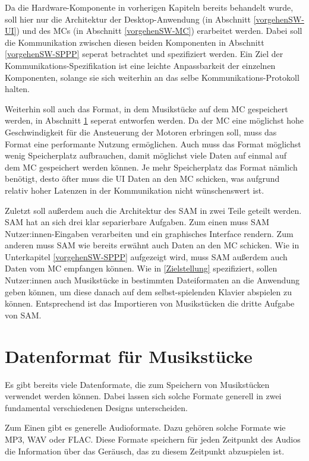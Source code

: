 Da die Hardware-Komponente in vorherigen Kapiteln bereits behandelt wurde, soll hier nur die Architektur der Desktop-Anwendung (in Abschnitt \ref{vorgehenSW-UI}) und des \ac{MC}s (in Abschnitt \ref{vorgehenSW-MC}) erarbeitet werden.
Dabei soll die Kommunikation zwischen diesen beiden Komponenten in Abschnitt \ref{vorgehenSW-SPPP} seperat betrachtet und spezifiziert werden.
Ein Ziel der Kommunikations-Spezifikation ist eine leichte Anpassbarkeit der einzelnen Komponenten, solange sie sich weiterhin an das selbe Kommunikations-Protokoll halten.

Weiterhin soll auch das Format, in dem Musikstücke auf dem \ac{MC} gespeichert werden, in Abschnitt \ref{vorgehenSW-PIDI} seperat entworfen werden.
Da der \ac{MC} eine möglichst hohe Geschwindigkeit für die Ansteuerung der Motoren erbringen soll, muss das Format eine performante Nutzung ermöglichen.
Auch muss das Format möglichst wenig Speicherplatz aufbrauchen, damit möglichst viele Daten auf einmal auf dem \ac{MC} gespeichert werden können.
Je mehr Speicherplatz das Format nämlich benötigt, desto öfter muss die \ac{UI} Daten an den \ac{MC} schicken, was aufgrund relativ hoher Latenzen in der Kommunikation nicht wünschenswert ist.

Zuletzt soll außerdem auch die Architektur des \ac{SAM} in zwei Teile geteilt werden.
\ac{SAM} hat an sich drei klar separierbare Aufgaben.
Zum einen muss \ac{SAM} Nutzer:innen-Eingaben verarbeiten und ein graphisches Interface rendern.
Zum anderen muss \ac{SAM} wie bereits erwähnt auch Daten an den \ac{MC} schicken.
Wie in Unterkapitel \ref{vorgehenSW-SPPP} aufgezeigt wird, muss \ac{SAM} außerdem auch Daten vom \ac{MC} empfangen können.
Wie in \ref{Zielstellung} spezifiziert, sollen Nutzer:innen auch Musikstücke in bestimmten Dateiformaten an die Anwendung geben können, um diese danach auf dem selbst-spielenden Klavier abspielen zu können.
Entsprechend ist das Importieren von Musikstücken die dritte Aufgabe von \ac{SAM}.


\section{Datenformat für Musikstücke} \label{vorgehenSW-PIDI}

Es gibt bereits viele Datenformate, die zum Speichern von Musikstücken verwendet werden können. Dabei lassen sich solche Formate generell in zwei fundamental verschiedenen Designs unterscheiden.

Zum Einen gibt es generelle Audioformate. Dazu gehören solche Formate wie MP3, WAV oder FLAC.
Diese Formate speichern für jeden Zeitpunkt des Audios die Information über das Geräusch, das zu diesem Zeitpunkt abzuspielen ist.

